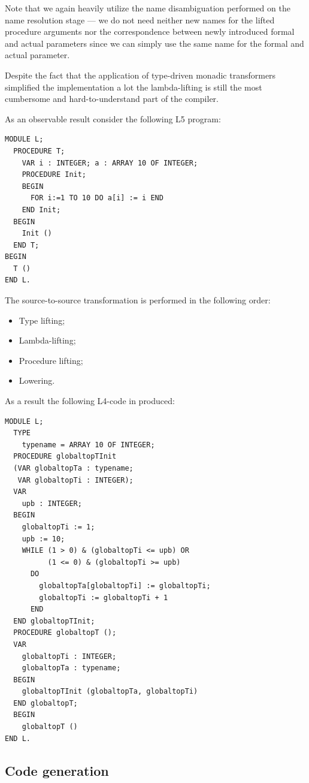 Note that we again heavily utilize the name disambiguation performed on the name resolution stage --- we do
not need neither new names for the lifted procedure arguments nor the correspondence between newly introduced
formal and actual parameters since we can simply use the same name for the formal and actual parameter.

Despite the fact that the application of type-driven monadic transformers simplified the implementation a lot the
lambda-lifting is still the most cumbersome and hard-to-understand part of the compiler.

As an observable result consider the following L5 program:

\begin{lstlisting}[language=oberon0]
MODULE L;
  PROCEDURE T;
    VAR i : INTEGER; a : ARRAY 10 OF INTEGER;
    PROCEDURE Init;
    BEGIN
      FOR i:=1 TO 10 DO a[i] := i END
    END Init;
  BEGIN
    Init ()  
  END T;
BEGIN
  T ()
END L.
\end{lstlisting}

The source-to-source transformation is performed in the following order:

\begin{itemize}
\item Type lifting;
\item Lambda-lifting;
\item Procedure lifting;
\item Lowering.
\end{itemize}

As a result the following L4-code in produced:

\begin{lstlisting}[language=oberon0]
MODULE L;
  TYPE
    typename = ARRAY 10 OF INTEGER;
  PROCEDURE globaltopTInit 
  (VAR globaltopTa : typename; 
   VAR globaltopTi : INTEGER);
  VAR
    upb : INTEGER;
  BEGIN
    globaltopTi := 1; 
    upb := 10; 
    WHILE (1 > 0) & (globaltopTi <= upb) OR 
          (1 <= 0) & (globaltopTi >= upb)
      DO
        globaltopTa[globaltopTi] := globaltopTi; 
        globaltopTi := globaltopTi + 1
      END
  END globaltopTInit;
  PROCEDURE globaltopT ();
  VAR
    globaltopTi : INTEGER;
    globaltopTa : typename;
  BEGIN
    globaltopTInit (globaltopTa, globaltopTi)
  END globaltopT;
  BEGIN
    globaltopT ()
END L.
\end{lstlisting}

\subsection{Code generation}


